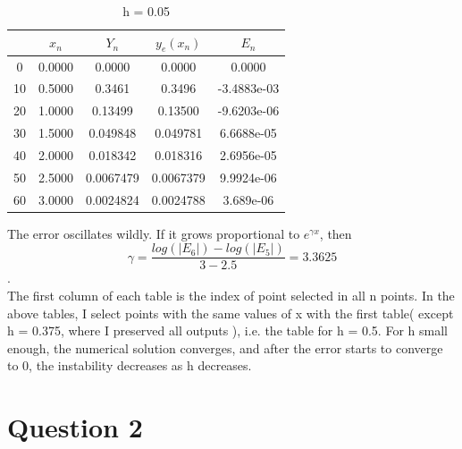 \documentclass[11pt]{article}
\begin{document}
\begin{table}[H]
\centering
\caption{h = 0.05}      
\begin{tabular}{|c|c|c|c|c|}               
\hline                                     
 & $x_{n}$ & $Y_{n} $& $y_{e}(x_{n})$ & $E_{n}$\\        
\hline                                     
0 & 0.0000 & 0.0000 & 0.0000 & 0.0000 \\  
\hline                                                                 
10 & 0.5000 & 0.3461 & 0.3496 & -3.4883e-03 \\
\hline                                                             
20 & 1.0000 & 0.13499 & 0.13500 & -9.6203e-06 \\
\hline                                                                
30 & 1.5000 & 0.049848 &0.049781 & 6.6688e-05 \\ 
\hline                                                                    
40 & 2.0000 & 0.018342  & 0.018316  & 2.6956e-05 \\ 
\hline                                                                  
50 & 2.5000 & 0.0067479 & 0.0067379 & 9.9924e-06 \\ 
\hline                                                                      
60 & 3.0000 & 0.0024824 & 0.0024788 & 3.689e-06 \\ 
\hline                                                                 
\end{tabular}                                            
\end{table}  
\pagebreak
The error oscillates wildly. If it grows proportional to $e^{\gamma x}$, then
$$\gamma = \frac{log(\mathopen|E_{6}\mathclose|)-log(\mathopen|E_{5}\mathclose|)}{3-2.5}  = 3.3625$$.
\\
The first column of each table is the index of point selected in all n points. In the above tables, I select points with the same values of x with the first table( except h = 0.375, where I preserved all outputs ), i.e. the table for h = 0.5. For h small enough, the numerical solution converges, and after the error starts to converge to 0, the instability decreases as h decreases.
\section*{Question 2}
\end{document}
